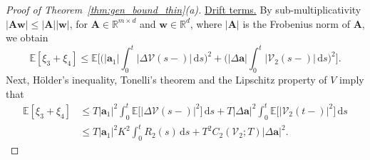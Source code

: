 \documentclass[en,oneside,bbfont,article]{amsart}
\theoremstyle{remark}
\theoremstyle{definition}
\theoremstyle{definition}
\newcommand{\V}{\bm{\mathcal{V}}}
\newcommand\R{\mathbb{R}}
\newcommand\E{\mathds{E}}
\newcommand\1{\mathds{1}}
\renewcommand\le{\leqslant}
\newcommand{\D}{\mathrm{d}}
\begin{document}
\begin{proof}[Proof of Theorem~\ref{thm:gen_bound_thin}(a)]
{\underline{Drift terms.}} By sub-multiplicativity $|\bm{A} \bm{w}| \le |\bm{A}||\bm{w}|$, for $\bm{A} \in \R^{m \times d}$ and $\bm{w} \in \R^d$, where $|\bm{A}|$ is the Frobenius norm of $\bm{A}$, we obtain
\[
\E[\xi_{3}+\xi_{4}]
\le \E\bigg[ 
\bigg(|\bm{a}_1|\int_0^t |\Delta\V(s-)|\,\D s\bigg)^2
+\bigg(|\Delta\bm{a}|\int_0^t|\V_2(s-)|\,\D s\bigg)^2\bigg].
\]
Next, H\"older's inequality, Tonelli's theorem and the Lipschitz property of $V$ imply that
\begin{align}
\E[\xi_{3}+\xi_{4}]
&\le T|\bm{a}_1|^2\int_0^t \E\big[|\Delta\V(s-)|^2\big]\,\D s
+T|\Delta\bm{a}|^2\int_0^t\E\big[|\V_2(t-)|^2\big]\,\D s
\nonumber\\
\label{eq:drift_bound_thinning_p<2}
&\le 
T|\bm{a}_1|^2K^2 \int_0^t R_2(s)\,\D s
+ T^2C_2(\V_2;T)|\Delta\bm{a}|^2.
\end{align}


\end{proof}
\end{document}
